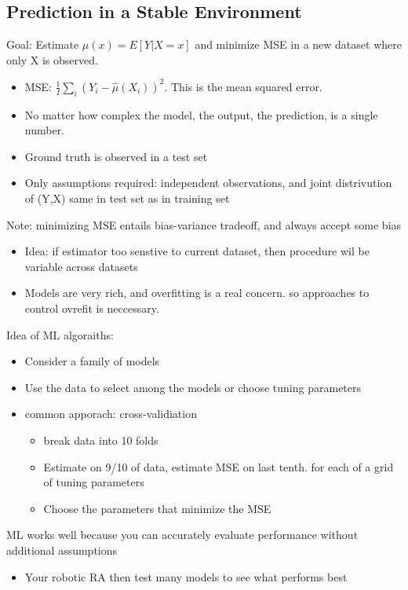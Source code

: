 \documentclass{article}
\begin{document}
\subsection{Prediction in a Stable Environment}

Goal: Estimate $\mu (x) = E[Y | X = x]$ and minimize MSE in a new dataset where only X is observed.
\begin{itemize}
    \item MSE: $\frac{1}{I}\sum_i (Y_i - \hat{\mu} (X_i))^2$. This is the mean squared error.
    \item No matter how complex the model, the output, the prediction, is a single number.
    \item Ground truth is observed in a test set
    \item Only assumptions required: independent observations, and joint distrivution of (Y,X) same in test set as in training set
\end{itemize}

Note: minimizing MSE entails bias-variance tradeoff, and always accept some bias
\begin{itemize}
    \item Idea: if estimator too senstive to current dataset, then procedure wil be variable across datasets
    \item Models are very rich, and overfitting is a real concern. so approaches to control ovrefit is neccessary.
\end{itemize}

Idea of ML algoraiths:
\begin{itemize}
    \item Consider a family of models
    \item Use the data to select among the models or choose tuning parameters
    \item common apporach: cross-validiation
    \begin{itemize}
        \item break data into 10 folds
        \item Estimate on 9/10 of data, estimate MSE on last tenth. for each of a grid of tuning parameters
        \item Choose the parameters that minimize the MSE
    \end{itemize}
\end{itemize}

ML works well because you can accurately evaluate performance without additional assumptions
\begin{itemize}
    \item Your robotic RA then test many models to see what performs best
\end{itemize}
\end{document}
